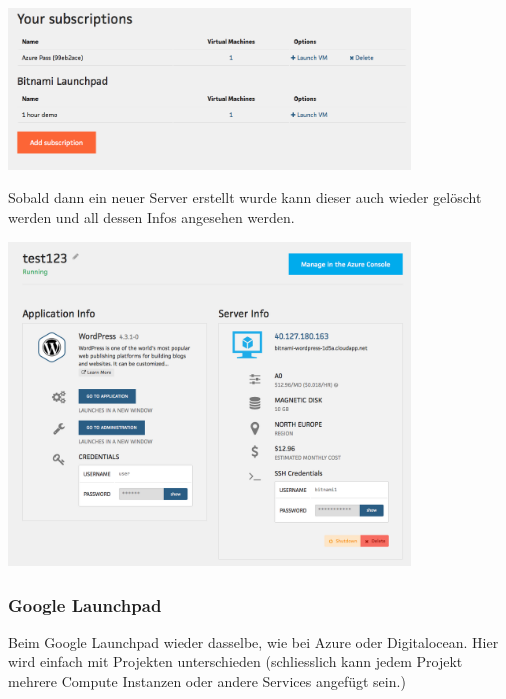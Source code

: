 \includegraphics[width=0.8\textwidth]{./03_Analyse/03_Bitnami/images/azure_subscriptions}


Sobald dann ein neuer Server erstellt wurde kann dieser auch wieder gelöscht 
werden und all dessen Infos angesehen werden.

\includegraphics[width=0.8\textwidth]{./03_Analyse/03_Bitnami/images/azure_instanceinfos}

\subsubsection{Google Launchpad}

Beim Google Launchpad wieder dasselbe, wie bei Azure oder Digitalocean.
Hier wird einfach mit Projekten unterschieden (schliesslich kann jedem Projekt mehrere Compute Instanzen 
oder andere Services angefügt sein.)


